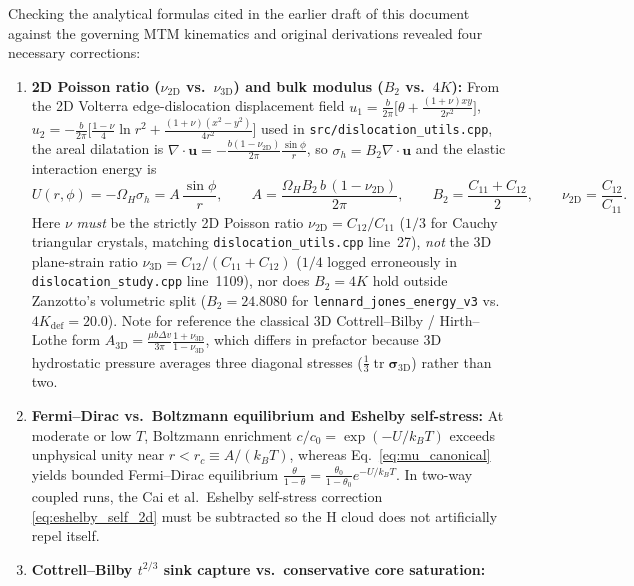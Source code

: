 \documentclass[11pt,a4paper]{article}
\newcommand{\tr}{\operatorname{tr}}
\newcommand{\code}[1]{\texttt{#1}}
\begin{document}
Checking the analytical formulas cited in the earlier draft of this document against the governing MTM kinematics and original derivations revealed four necessary corrections:
\begin{enumerate}[nosep]
  \item \textbf{2D Poisson ratio ($\nu_{2\mathrm{D}}$ vs.\ $\nu_{3\mathrm{D}}$) and bulk modulus ($B_2$ vs.\ $4K$):}
  From the 2D Volterra edge-dislocation displacement field $u_1 = \frac{b}{2\pi}\bigl[\theta + \frac{(1+\nu)xy}{2r^2}\bigr]$, $u_2 = -\frac{b}{2\pi}\bigl[\frac{1-\nu}{4}\ln r^2 + \frac{(1+\nu)(x^2-y^2)}{4r^2}\bigr]$ used in \code{src/dislocation\_utils.cpp}, the areal dilatation is $\nabla\cdot\mathbf{u} = -\frac{b(1-\nu_{2\mathrm{D}})}{2\pi}\frac{\sin\phi}{r}$, so $\sigma_h = B_2\nabla\cdot\mathbf{u}$ and the elastic interaction energy is
  \begin{equation}
    U(r,\phi) = -\Omega_H\sigma_h = A\,\frac{\sin\phi}{r}, \qquad
    A = \frac{\Omega_H B_2\, b\,(1 - \nu_{2\mathrm{D}})}{2\pi}, \qquad
    B_2 = \frac{C_{11}+C_{12}}{2}, \qquad
    \nu_{2\mathrm{D}} = \frac{C_{12}}{C_{11}}.
    \label{eq:cottrell_U}
  \end{equation}
  Here $\nu$ \emph{must} be the strictly 2D Poisson ratio $\nu_{2\mathrm{D}} = C_{12}/C_{11}$ ($1/3$ for Cauchy triangular crystals, matching \code{dislocation\_utils.cpp} line~27), \emph{not} the 3D plane-strain ratio $\nu_{3\mathrm{D}} = C_{12}/(C_{11}+C_{12})$ ($1/4$ logged erroneously in \code{dislocation\_study.cpp} line~1109), nor does $B_2 = 4K$ hold outside Zanzotto's volumetric split ($B_2 = 24.8080$ for \code{lennard\_jones\_energy\_v3} vs.\ $4K_{\text{def}} = 20.0$). Note for reference the classical 3D Cottrell--Bilby / Hirth--Lothe form $A_{3\mathrm{D}} = \frac{\mu b \Delta v}{3\pi}\frac{1+\nu_{3\mathrm{D}}}{1-\nu_{3\mathrm{D}}}$, which differs in prefactor because 3D hydrostatic pressure averages three diagonal stresses ($\frac{1}{3}\tr\boldsymbol{\sigma}_{3\mathrm{D}}$) rather than two.
  \item \textbf{Fermi--Dirac vs.\ Boltzmann equilibrium and Eshelby self-stress:}
  At moderate or low $T$, Boltzmann enrichment $c/c_0 = \exp(-U/k_B T)$ exceeds unphysical unity near $r < r_c \equiv A/(k_B T)$, whereas Eq.~\eqref{eq:mu_canonical} yields bounded Fermi--Dirac equilibrium $\frac{\theta}{1-\theta} = \frac{\theta_0}{1-\theta_0}e^{-U/k_B T}$. In two-way coupled runs, the Cai et al.\ Eshelby self-stress correction \eqref{eq:eshelby_self_2d} must be subtracted so the H cloud does not artificially repel itself.
  \item \textbf{Cottrell--Bilby $t^{2/3}$ sink capture vs.\ conservative core saturation:}

\end{enumerate}
\end{document}
